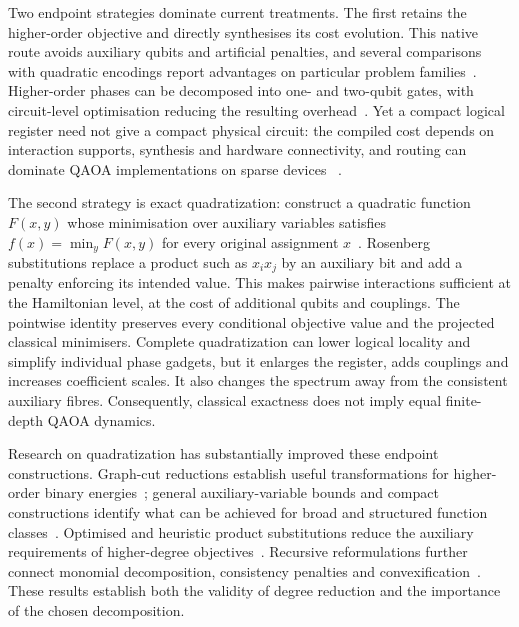 \documentclass[a4paper,onecolumn,11pt,unpublished]{quantumarticle}
\theoremstyle{remark}
\begin{document}
Two endpoint strategies dominate current treatments. The first retains the
higher-order objective and directly synthesises its cost evolution. This
native route avoids auxiliary qubits and artificial penalties, and several
comparisons with quadratic encodings report advantages on particular problem
families~\cite{Glos2022,CampbellDahl2022,Stein2023,Bell2025}. Higher-order
phases can be decomposed into one- and two-qubit gates, with circuit-level
optimisation reducing the resulting overhead~\cite{Verchere2023}. Yet a compact
logical register need not give a compact physical circuit: the compiled cost
depends on interaction supports, synthesis and hardware connectivity, and
routing can dominate QAOA implementations on sparse devices
~\cite{Weidenfeller2022,Harrigan2021}.

The second strategy is exact quadratization: construct a quadratic function
$F(x,y)$ whose minimisation over auxiliary variables satisfies
$f(x)=\min_yF(x,y)$ for every original assignment
$x$~\cite{Rosenberg1975,BorosGruber2014,Dattani2019}. Rosenberg substitutions
replace a product such as $x_i x_j$ by an auxiliary bit and add a penalty
enforcing its intended value. This makes pairwise interactions sufficient
at the Hamiltonian level, at the cost of additional qubits and couplings.
The pointwise identity preserves every conditional objective value and the
projected classical minimisers. Complete quadratization can lower logical
locality and simplify individual phase gadgets, but it enlarges the register,
adds couplings and increases coefficient scales. It also changes the spectrum
away from the consistent auxiliary fibres. Consequently, classical exactness
does not imply equal finite-depth QAOA dynamics.

Research on quadratization has substantially improved these endpoint
constructions.
Graph-cut reductions establish useful transformations for higher-order binary
energies~\cite{FreedmanDrineas2005,Ishikawa2011}; general auxiliary-variable
bounds and compact constructions identify what can be achieved for broad
and structured function classes~\cite{AnthonyEtAl2017,Anthony2016,
BorosCramaRodriguezHeck2020}. Optimised and heuristic product substitutions
reduce the auxiliary requirements of higher-degree
objectives~\cite{VermaLewis2020,VermaLewisKochenberger2021}. Recursive
reformulations further connect monomial decomposition, consistency penalties
and convexification~\cite{CramaEtAl2025}. These results establish both the
validity of degree reduction and the importance of the chosen decomposition.
\end{document}
